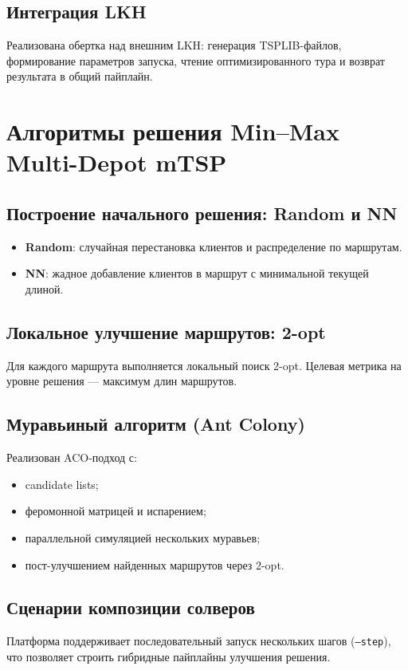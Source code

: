 \documentclass[a4paper,12pt]{extarticle}
\begin{document}
\subsection{Интеграция LKH}
Реализована обертка над внешним LKH: генерация TSPLIB-файлов, формирование параметров запуска, чтение оптимизированного тура и возврат результата в общий пайплайн.

\pagebreak

\section{Алгоритмы решения Min--Max Multi-Depot mTSP}

\subsection{Построение начального решения: Random и NN}
\begin{itemize}
    \item \textbf{Random}: случайная перестановка клиентов и распределение по маршрутам.
    \item \textbf{NN}: жадное добавление клиентов в маршрут с минимальной текущей длиной.
\end{itemize}

\subsection{Локальное улучшение маршрутов: 2-opt}
Для каждого маршрута выполняется локальный поиск 2-opt.
Целевая метрика на уровне решения --- максимум длин маршрутов.

\subsection{Муравьиный алгоритм (Ant Colony)}
Реализован ACO-подход с:
\begin{itemize}
    \item candidate lists;
    \item феромонной матрицей и испарением;
    \item параллельной симуляцией нескольких муравьев;
    \item пост-улучшением найденных маршрутов через 2-opt.
\end{itemize}

\subsection{Сценарии композиции солверов}
Платформа поддерживает последовательный запуск нескольких шагов (\texttt{--step}), что позволяет строить гибридные пайплайны улучшения решения.
\end{document}
